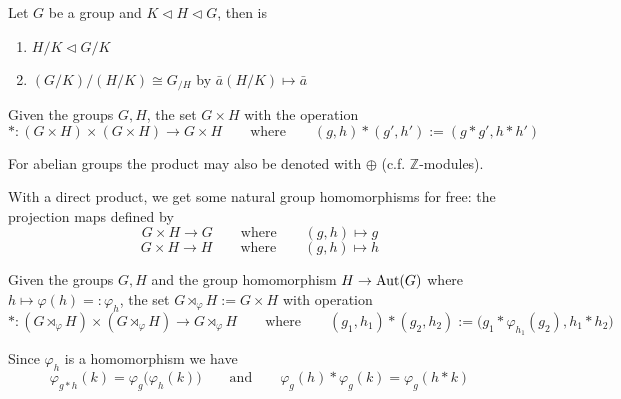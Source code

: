 \begin{proposition}
   Let \(G\) be a group and \(K \triangleleft H \triangleleft G\), then is
   \begin{enumerate}[label=\roman*, align=Center]
      \item \(H/K \triangleleft G/K\)
      \item \((G/K)/(H/K) \cong G_{/H}\) by \(\bar{a}(H/K) \mapsto \bar{a}\)
   \end{enumerate}
\end{proposition}

\begin{definition}
   Given the groups \(G, H\), the set \(G \times H\) with the operation
   \[\ast: (G \times H) \times (G \times H) \to G \times H \qquad\text{where}\qquad (g, h) \ast (g', h') := (g \ast g', h \ast h')\]
\end{definition}
\begin{remark}[Notation]
   For abelian groups the product may also be denoted with \(\oplus\) (c.f. \(\mathbb{Z}\)-modules).
\end{remark}
\begin{remark}
   With a direct product, we get some natural group homomorphisms for free: the projection maps defined by
   \[G \times H \to G \qquad \text{where}\qquad (g, h) \mapsto g\]
   \[G \times H \to H \qquad \text{where}\qquad (g, h) \mapsto h\]
\end{remark}

\begin{definition}
   Given the groups \(G, H\) and the group homomorphism \(H \to \operatorname{Aut}(G)\) where \(h \mapsto \varphi(h) =: \varphi_h\), the set \(G \rtimes_\varphi H := G \times H\) with operation
   \[\ast: (G \rtimes_\varphi H) \times (G \rtimes_\varphi H) \to G \rtimes_\varphi H \qquad\text{where}\qquad (g_1, h_1) \ast (g_2, h_2) := \big(g_1 \ast \varphi_{h_1}(g_2), h_1 \ast h_2\big)\]
\end{definition}
\begin{remark}
   Since \(\varphi_h\) is a homomorphism we have
   \[\varphi_{g \ast h}(k) = \varphi_g\big(\varphi_h(k)\big) \qquad\text{and}\qquad \varphi_g(h) \ast \varphi_g(k) = \varphi_g(h \ast k)\]
\end{remark}

